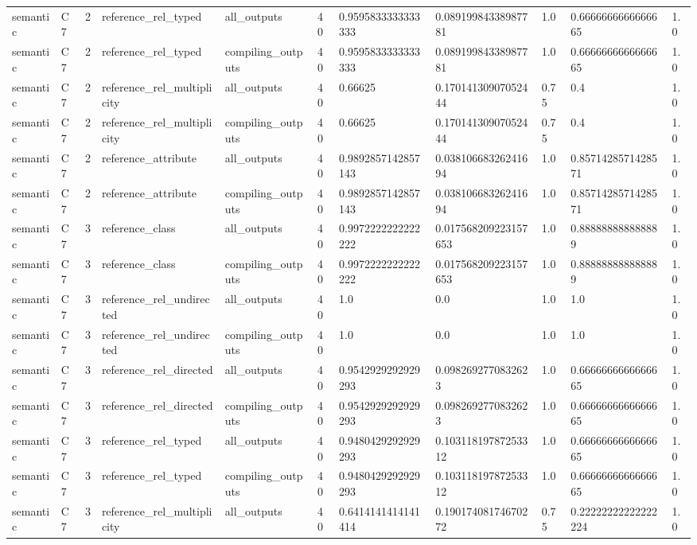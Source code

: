 \begin{tabular}{lllllllllll}
semantic & C7 & 2 & reference\_rel\_typed & all\_outputs & 40 & 0.9595833333333333 & 0.08919984338987781 & 1.0 & 0.6666666666666665 & 1.0 \\
semantic & C7 & 2 & reference\_rel\_typed & compiling\_outputs & 40 & 0.9595833333333333 & 0.08919984338987781 & 1.0 & 0.6666666666666665 & 1.0 \\
semantic & C7 & 2 & reference\_rel\_multiplicity & all\_outputs & 40 & 0.66625 & 0.17014130907052444 & 0.75 & 0.4 & 1.0 \\
semantic & C7 & 2 & reference\_rel\_multiplicity & compiling\_outputs & 40 & 0.66625 & 0.17014130907052444 & 0.75 & 0.4 & 1.0 \\
semantic & C7 & 2 & reference\_attribute & all\_outputs & 40 & 0.9892857142857143 & 0.03810668326241694 & 1.0 & 0.8571428571428571 & 1.0 \\
semantic & C7 & 2 & reference\_attribute & compiling\_outputs & 40 & 0.9892857142857143 & 0.03810668326241694 & 1.0 & 0.8571428571428571 & 1.0 \\
semantic & C7 & 3 & reference\_class & all\_outputs & 40 & 0.9972222222222222 & 0.017568209223157653 & 1.0 & 0.888888888888889 & 1.0 \\
semantic & C7 & 3 & reference\_class & compiling\_outputs & 40 & 0.9972222222222222 & 0.017568209223157653 & 1.0 & 0.888888888888889 & 1.0 \\
semantic & C7 & 3 & reference\_rel\_undirected & all\_outputs & 40 & 1.0 & 0.0 & 1.0 & 1.0 & 1.0 \\
semantic & C7 & 3 & reference\_rel\_undirected & compiling\_outputs & 40 & 1.0 & 0.0 & 1.0 & 1.0 & 1.0 \\
semantic & C7 & 3 & reference\_rel\_directed & all\_outputs & 40 & 0.9542929292929293 & 0.0982692770832623 & 1.0 & 0.6666666666666665 & 1.0 \\
semantic & C7 & 3 & reference\_rel\_directed & compiling\_outputs & 40 & 0.9542929292929293 & 0.0982692770832623 & 1.0 & 0.6666666666666665 & 1.0 \\
semantic & C7 & 3 & reference\_rel\_typed & all\_outputs & 40 & 0.9480429292929293 & 0.10311819787253312 & 1.0 & 0.6666666666666665 & 1.0 \\
semantic & C7 & 3 & reference\_rel\_typed & compiling\_outputs & 40 & 0.9480429292929293 & 0.10311819787253312 & 1.0 & 0.6666666666666665 & 1.0 \\
semantic & C7 & 3 & reference\_rel\_multiplicity & all\_outputs & 40 & 0.6414141414141414 & 0.19017408174670272 & 0.75 & 0.22222222222222224 & 1.0 \\

\end{tabular}
